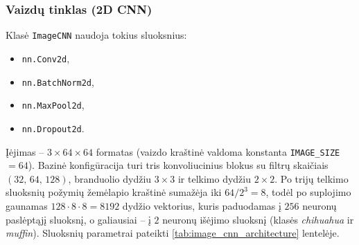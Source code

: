 \subsubsection{Vaizdų tinklas (2D CNN)}
\label{subsubsec:image_cnn}

Klasė \texttt{ImageCNN} naudoja tokius sluoksnius:
\begin{itemize}
    \item \texttt{nn.Conv2d},
    \item \texttt{nn.BatchNorm2d},
    \item \texttt{nn.MaxPool2d},
    \item \texttt{nn.Dropout2d}.
\end{itemize}
Įėjimas – $3 \times 64 \times 64$ formatas (vaizdo kraštinė valdoma konstanta \texttt{IMAGE\_SIZE} $= 64$). Bazinė konfigūracija turi tris konvoliucinius blokus su filtrų skaičiais $(32,\,64,\,128)$, branduolio dydžiu $3 \times 3$ ir telkimo dydžiu $2 \times 2$. Po trijų telkimo sluoksnių požymių žemėlapio kraštinė sumažėja iki $64 / 2^{3} = 8$, todėl po suplojimo gaunamas $128 \cdot 8 \cdot 8 = 8192$ dydžio vektorius, kuris paduodamas į $256$ neuronų paslėptąjį sluoksnį, o galiausiai – į $2$ neuronų išėjimo sluoksnį (klasės \textit{chihuahua} ir \textit{muffin}). Sluoksnių parametrai pateikti \ref{tab:image_cnn_architecture} lentelėje.


